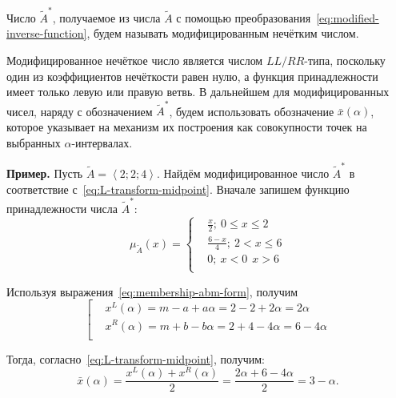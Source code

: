 \begin{mydef}
Число $\tilde A^{*}$, получаемое из числа $\tilde{A}$ с помощью преобразования~\eqref{eq:modified-inverse-function}, будем называть модифицированным нечётким числом.
\end{mydef}
Модифицированное нечёткое число является числом $LL/RR$-типа, поскольку один из коэффициентов нечёткости равен нулю, а функция принадлежности имеет только левую или правую ветвь. В дальнейшем для модифицированных чисел, наряду с обозначением $\tilde A^{*}$, будем использовать обозначение $\bar{x}\left( \alpha  \right)$, которое указывает на механизм их построения как совокупности точек на выбранных $\alpha$-интервалах.

\textbf{Пример.} Пусть $\tilde{A}=\left\langle 2;2;4 \right\rangle $. Найдём модифицированное число $\tilde A^{*}$ в соответствие с~\eqref{eq:L-transform-midpoint}.
Вначале запишем функцию принадлежности числа $\tilde A^{*}$:
\begin{equation*}
	\mu_{\tilde A} \left( x \right)=\left\{ 
	  \begin{aligned}
        & \frac{x}{2};\ 0\le x\le 2 \\ 
        & \frac{6-x}{4};\ 2<x\le 6 \\ 
        & 0;\ x<0\ \ x>6 \\ 
      \end{aligned} \right.
\end{equation*}

Используя выражения~\eqref{eq:membership-abm-form}, получим
\begin{equation*}
	\left[ \begin{aligned}
      & {{x}^{L}}\left( \alpha  \right)=m-a+a\alpha =2-2+2\alpha =2\alpha  \\ 
      & {{x}^{R}}\left( \alpha  \right)=m+b-b\alpha =2+4-4\alpha =6-4\alpha  \\ 
    \end{aligned} \right.
\end{equation*}

Тогда, согласно~\eqref{eq:L-transform-midpoint}, получим:
\begin{equation*}
	\bar{x}\left( \alpha  \right)=\frac{{{x}^{L}}\left( \alpha  \right)+{{x}^{R}}\left( \alpha  \right)}{2}=\frac{2\alpha +6-4\alpha }{2}=3-\alpha.
\end{equation*}

